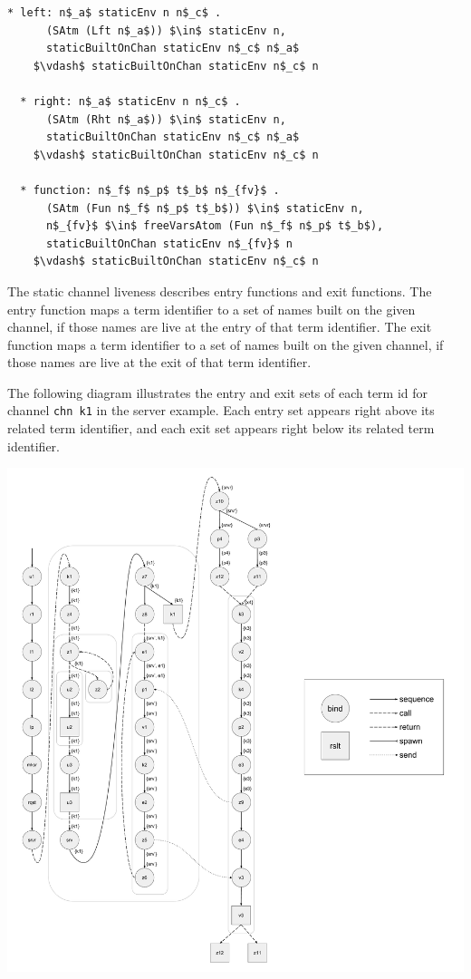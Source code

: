 \documentclass[letterpaper, 11pt]{extarticle}
\begin{document}
\begin{lstlisting}[language=logic, mathescape]
  * left: n$_a$ staticEnv n n$_c$ .
      (SAtm (Lft n$_a$)) $\in$ staticEnv n,
      staticBuiltOnChan staticEnv n$_c$ n$_a$
    $\vdash$ staticBuiltOnChan staticEnv n$_c$ n

  * right: n$_a$ staticEnv n n$_c$ .
      (SAtm (Rht n$_a$)) $\in$ staticEnv n,
      staticBuiltOnChan staticEnv n$_c$ n$_a$
    $\vdash$ staticBuiltOnChan staticEnv n$_c$ n

  * function: n$_f$ n$_p$ t$_b$ n$_{fv}$ .
      (SAtm (Fun n$_f$ n$_p$ t$_b$)) $\in$ staticEnv n,
      n$_{fv}$ $\in$ freeVarsAtom (Fun n$_f$ n$_p$ t$_b$),
      staticBuiltOnChan staticEnv n$_{fv}$ n
    $\vdash$ staticBuiltOnChan staticEnv n$_c$ n
\end{lstlisting}

The static channel liveness describes entry functions and exit functions.
The entry function maps a term identifier to a set of names built on
the given channel, if those names are live at the entry of that term identifier.
The exit function maps a term identifier to a
set of names built on the given channel, if those names are live at the exit of that
term identifier.

The following diagram illustrates the entry and exit sets of each term id
for channel \lstinline{chn k1} in the server example.
Each entry set appears right above its related term identifier,
and each exit set appears right below its related term identifier. 

\includegraphics[width=1\textwidth]{cml-liveness-analysis-k1.pdf}
\end{document}
